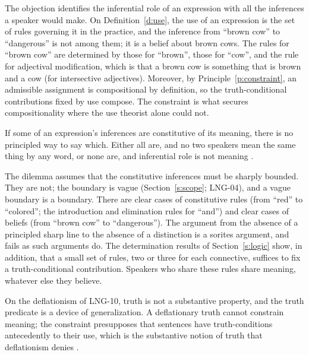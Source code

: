 \documentclass{situationist-preprint}
\begin{document}
\begin{reply}
The objection identifies the inferential role of an expression with all the inferences a speaker would make. On Definition~\ref{d:use}, the use of an expression is the set of rules governing it in the practice, and the inference from \enquote{brown cow} to \enquote{dangerous} is not among them; it is a belief about brown cows. The rules for \enquote{brown cow} are determined by those for \enquote{brown}, those for \enquote{cow}, and the rule for adjectival modification, which is that a brown cow is something that is brown and a cow (for intersective adjectives). Moreover, by Principle~\ref{p:constraint}, an admissible assignment is compositional by definition, so the truth-conditional contributions fixed by use compose. The constraint is what secures compositionality where the use theorist alone could not.
\end{reply}

\begin{objection}[Holism]
If some of an expression's inferences are constitutive of its meaning, there is no principled way to say which. Either all are, and no two speakers mean the same thing by any word, or none are, and inferential role is not meaning \citep{FodorLepore1992}.
\end{objection}

\begin{reply}
The dilemma assumes that the constitutive inferences must be sharply bounded. They are not; the boundary is vague (Section~\ref{s:scope}; LNG-04), and a vague boundary is a boundary. There are clear cases of constitutive rules (from \enquote{red} to \enquote{colored}; the introduction and elimination rules for \enquote{and}) and clear cases of beliefs (from \enquote{brown cow} to \enquote{dangerous}). The argument from the absence of a principled sharp line to the absence of a distinction is a sorites argument, and fails as such arguments do. The determination results of Section~\ref{s:logic} show, in addition, that a small set of rules, two or three for each connective, suffices to fix a truth-conditional contribution. Speakers who share these rules share meaning, whatever else they believe.
\end{reply}

\begin{objection}[Deflationism]
On the deflationism of LNG-10, truth is not a substantive property, and the truth predicate is a device of generalization. A deflationary truth cannot constrain meaning; the constraint presupposes that sentences have truth-conditions antecedently to their use, which is the substantive notion of truth that deflationism denies \citep{Dummett1991,Horwich1998}.
\end{objection}
\end{document}
